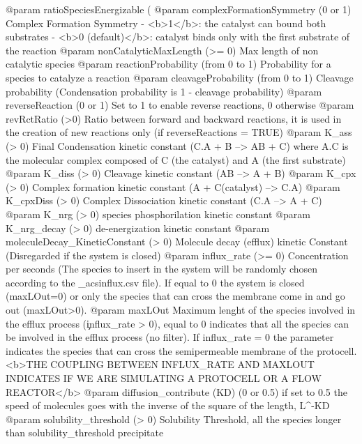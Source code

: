 \begin{DoxyVerb}
 @param ratioSpeciesEnergizable (%
          @param complexFormationSymmetry (0 or 1) Complex Formation Symmetry
                          - <b>1</b>: the catalyst can bound both substrates
                          - <b>0 (default)</b>: catalyst binds only with the first substrate of the reaction
          @param nonCatalyticMaxLength (>= 0) Max length of non catalytic species
          @param reactionProbability (from 0 to 1) Probability for a species to catalyze a reaction
          @param cleavageProbability (from 0 to 1) Cleavage probability (Condensation probability is 1 - cleavage probability)
          @param reverseReaction (0 or 1) Set to 1 to enable reverse reactions, 0 otherwise
 @param revRctRatio (>0) Ratio between forward and backward reactions, it is used in the creation of new reactions only (if reverseReactions = TRUE)
          @param K_ass (> 0) Final Condensation kinetic constant (C.A + B --> AB + C) where A.C is the molecular complex composed of C (the catalyst) and A (the first substrate)
          @param K_diss (> 0) Cleavage kinetic constant (AB --> A + B)
          @param K_cpx (> 0) Complex formation kinetic constant (A + C(catalyst) --> C.A)
          @param K_cpxDiss (> 0) Complex Dissociation kinetic constant (C.A --> A + C)
          @param K_nrg (> 0) species phosphorilation kinetic constant
          @param K_nrg_decay (> 0) de-energization kinetic constant
          @param moleculeDecay_KineticConstant (> 0) Molecule decay (efflux) kinetic Constant (Disregarded if the system is closed)
          @param influx_rate (>= 0) Concentration per seconds (The species to insert in the system will be randomly chosen according to the _acsinflux.csv file). If equal to 0 the system is closed (maxLOut=0) or only the species that can cross the membrane come in and go out (maxLOut>0).
          @param maxLOut Maximum lenght of the species involved in the efflux process (\c influx_rate  > 0), equal to 0 indicates that all the species can be involved in the efflux process (no filter). If influx_rate = 0 the parameter indicates the species that can cross the semipermeable membrane of the protocell. <b>THE COUPLING BETWEEN INFLUX_RATE AND MAXLOUT INDICATES IF WE ARE SIMULATING A PROTOCELL OR A FLOW REACTOR</b>
          @param diffusion_contribute (KD) (0 or 0.5) if set to 0.5 the speed of molecules goes with the inverse of the square of the length, L^{-KD}
          @param solubility_threshold (> 0) Solubility Threshold, all the species longer than solubility_threshold precipitate
\end{DoxyVerb}


